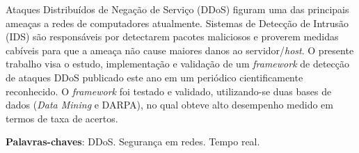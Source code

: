 \setlength{\absparsep}{18pt} %
\begin{resumo}
      Ataques Distribuídos de Negação de Serviço (DDoS) figuram uma das principais ameaças a redes de computadores atualmente. Sistemas de Detecção de Intrusão (IDS) são responsáveis por detectarem pacotes maliciosos e proverem medidas cabíveis para que a ameaça não cause maiores danos ao servidor/\textit{host}. O presente trabalho visa o estudo, implementação e validação de um \textit{framework} de detecção de ataques DDoS publicado este ano em um periódico cientificamente reconhecido. O \textit{framework} foi testado e validado, utilizando-se duas bases de dados (\textit{Data Mining} e DARPA), no qual obteve alto desempenho medido em termos de taxa de acertos.
      
\textbf{Palavras-chaves}: DDoS. Segurança em redes. Tempo real.
\end{resumo}